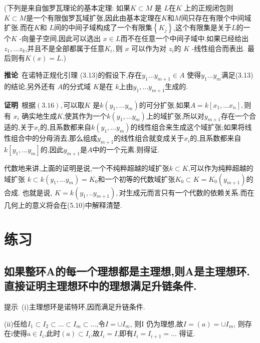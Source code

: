 \documentclass[UTF8]{book}
\begin{document}
		
		(下列是来自伽罗瓦理论的基本定理: 如果$K \subset M$ 是 $L$在$K$ 上的正规闭包则 $K \subset M$是一个有限伽罗瓦域扩张,因此由基本定理在$K$和$M$间只存在有限个中间域扩张.而在$K$和 $L$间的中间子域构成了一个有限集$\left\{ K _{ j }\right\}$,这个有限集是关于$ L $的一个$K$ -向量子空间,因此可以选出 $x \in L$而不在任意一个中间子域中.如果已经给出$z_{1}, \ldots z_{k}$,并且不是全部都属于任意$K _{ i },$则 $x$ 可以作为对 $z _{ i } $的 $K$ -线性组合而表出. 最后则有$K (x )= L$.)
		
		
		\textbf{推论}\  在诺特正规化引理 (3.13)的假设下,存在$y_{1} \ldots y_{m+1} \in A$ 使得$y_{1} \ldots y_{m}$满足(3.13)的结论,另外还有 $A$的分式域 $K$是在 $k$上由$y _{1}, \ldots y _{ m +1}$生成的.
		
		
		\textbf{证明}\ 根据$(3.16),$可以取$K$ 是$k \left(y _{1}, \ldots y _{ m }\right) $的可分扩张.如果$A = k \left[ x _{1}, \ldots x _{ n }\right],$则有 $x _{ i }$ 确实地生成$K$,使其作为一个$k \left(y _{1}, \ldots y _{ m }\right)$上的域扩张,所以对$y _{ m +1}$存在一个合适的,关于$x _{i}$的,且系数都来自$k \left(y _{1}, \ldots y _{ m }\right) $的线性组合来生成这个域扩张;如果将线性组合中的分母消去,那么组成$y _{ m +1}$的线性组合就变成关于$x _{i}$的,且系数都来自$k [  y _{1}, \ldots y _{ m } ] $的,因此$y _{ m +1}$是$ A $中的一个元素.则得证.
		
		
		代数地来讲,上面的证明是说,一个不纯粹超越的域扩张$k \subset K $,可以作为纯粹超越的域扩张 $k \subset k \left(y _{1}, \ldots y _{ m }\right)= K _{0}$和一个初等的代数域扩张$K _{0} \subset K = K _{0}\left(y _{ m +1}\right) $的合成. 也就是说, $K = k \left(y _{1}, . . y _{ m +1}\right),$对生成元而言只有一个代数的依赖关系.而在几何上的意义将会在(5.10)中解释清楚.
		
		
	\section*{练习}
	
	\subsection{ 如果整环A的每一个理想都是主理想,则A是主理想环.直接证明主理想环中的理想满足升链条件.}
	
	
	$\textbf{提示}$\ (i)主理想环是诺特环,因而满足升链条件.
	
	
	(ii)任给$I_{1} \subset I_{2} \subset ... \subset I_{m} \subset ...$,令$I= \cup I_{m}$, 则I 仍为理想,故$I=(a)=\cup I_{m}$, 则存在i使得a$\in I_{i}$,此时$(a) \subset I_{i}$,故$I_{i}=I$,即有$I_{i}=I_{i+1}=...$ 得证.
	
\end{document}
